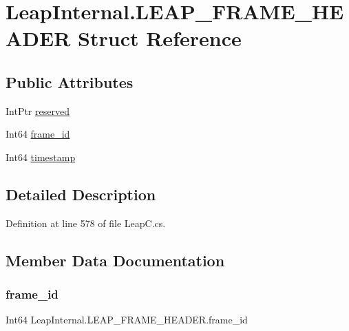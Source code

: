 \hypertarget{struct_leap_internal_1_1_l_e_a_p___f_r_a_m_e___h_e_a_d_e_r}{}\section{Leap\+Internal.\+L\+E\+A\+P\+\_\+\+F\+R\+A\+M\+E\+\_\+\+H\+E\+A\+D\+ER Struct Reference}
\label{struct_leap_internal_1_1_l_e_a_p___f_r_a_m_e___h_e_a_d_e_r}
\subsection*{Public Attributes}
\begin{DoxyCompactItemize}
\item 
Int\+Ptr \mbox{\hyperlink{struct_leap_internal_1_1_l_e_a_p___f_r_a_m_e___h_e_a_d_e_r_aaf345ecbfcdceced3935ccb76d35c871}{reserved}}
\item 
Int64 \mbox{\hyperlink{struct_leap_internal_1_1_l_e_a_p___f_r_a_m_e___h_e_a_d_e_r_a505537dcff6f66c04c5d62a571785312}{frame\+\_\+id}}
\item 
Int64 \mbox{\hyperlink{struct_leap_internal_1_1_l_e_a_p___f_r_a_m_e___h_e_a_d_e_r_a5d251bc27fa45a5da9b9a31f92d2835e}{timestamp}}
\end{DoxyCompactItemize}


\subsection{Detailed Description}


Definition at line 578 of file Leap\+C.\+cs.



\subsection{Member Data Documentation}
\mbox{\label{struct_leap_internal_1_1_l_e_a_p___f_r_a_m_e___h_e_a_d_e_r_a505537dcff6f66c04c5d62a571785312}} 
\subsubsection{\texorpdfstring{frame\_id}{frame\_id}}
{\footnotesize\ttfamily Int64 Leap\+Internal.\+L\+E\+A\+P\+\_\+\+F\+R\+A\+M\+E\+\_\+\+H\+E\+A\+D\+E\+R.\+frame\+\_\+id}



